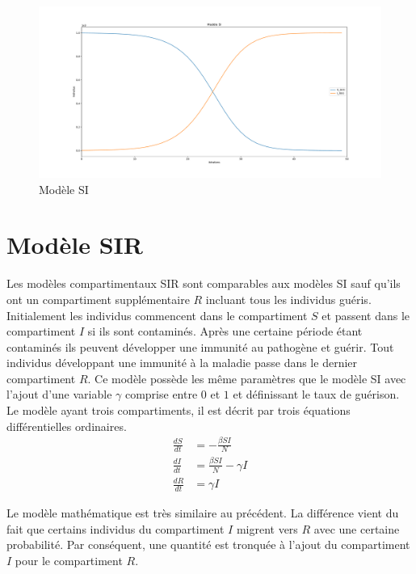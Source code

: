 \begin{figure}[h]
\centering
\captionsetup{justification=centering}
\includegraphics[scale=0.3]{Images/SI_exemple.pdf}
\caption{Modèle SI}
\end{figure}

\section{Modèle SIR}

Les modèles compartimentaux SIR sont comparables aux modèles SI sauf qu'ils ont un compartiment supplémentaire $R$ incluant tous les individus guéris. Initialement les individus commencent dans le compartiment $S$ et passent dans le compartiment $I$ si ils sont contaminés. Après une certaine période étant contaminés ils peuvent développer une immunité au pathogène et guérir. Tout individus développant une immunité à la maladie passe dans le dernier compartiment $R$. Ce modèle possède les même paramètres que le modèle SI avec l'ajout d'une variable $\gamma$ comprise entre $0$ et $1$ et définissant le taux de guérison.\\

Le modèle ayant trois compartiments, il est décrit par trois équations différentielles ordinaires.
\begin{align}
    \frac{dS}{dt} &= -\frac{\beta S I}{N}\\
    \frac{dI}{dt} &= \frac{\beta S I}{N} - \gamma I\\
    \frac{dR}{dt} &= \gamma I
\end{align}

Le modèle mathématique est très similaire au précédent. La différence vient du fait que certains individus du compartiment $I$ migrent vers $R$ avec une certaine probabilité. Par conséquent, une quantité est tronquée à l'ajout du compartiment $I$ pour le compartiment $R$.\\

